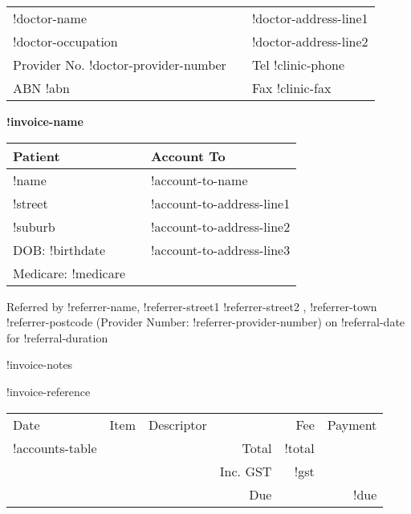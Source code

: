 \documentclass[12pt]{article}
\begin{document}
\begin{center}
\begin{tabular}{p{}>{\centering}p{}<{\centering}p{}<{\raggedleft}}
!doctor-name &  & !doctor-address-line1 \\
!doctor-occupation &  & !doctor-address-line2 \\
Provider No. !doctor-provider-number & & Tel !clinic-phone \\
ABN !abn & & Fax !clinic-fax \\ 
\hline
\end{tabular}

\vspace{7mm}

{ \Large \textbf{!invoice-name} }

\end{center}

\vspace{4mm}


\begin{tabular}{lp{5mm}l} 
Patient & & Account To\\ \midrule
!name & & !account-to-name \\
!street & & !account-to-address-line1 \\
!suburb & & !account-to-address-line2 \\
DOB: !birthdate &  & !account-to-address-line3 \\
Medicare:   !medicare & &   \\
\end{tabular}

\vspace{3mm}

Referred by !referrer-name, !referrer-street1 !referrer-street2 ,
!referrer-town !referrer-postcode (Provider Number: !referrer-provider-number)
on !referral-date for !referral-duration

\vspace{3mm}

!invoice-notes

!invoice-reference

\vspace{3mm}

\begin{tabularx}{\textwidth}{llp{50mm}rrr}
Date & Item & Descriptor & & Fee & Payment \\ \cmidrule(l){1-6}
!accounts-table
\cmidrule(l){5-6}
& & & Total & !total  & \\
& & & Inc. GST & !gst & \\ \cmidrule(l){5-6}
& & & Due & & !due \\
\end{tabularx}
\end{document}
